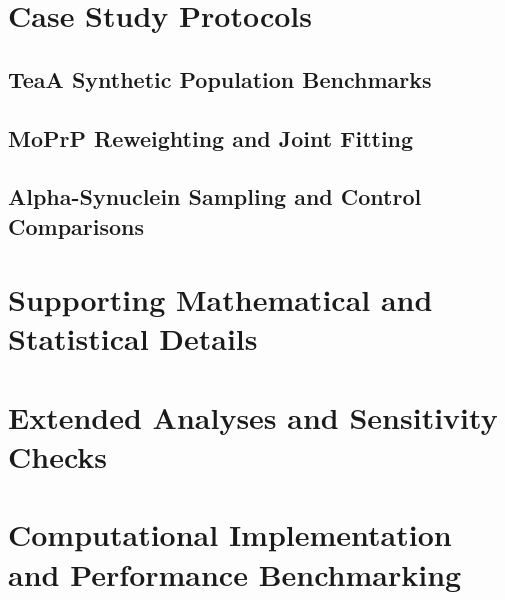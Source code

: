 \section{Case Study Protocols}
\label{app:jaxent-case-studies}

\subsection{TeaA Synthetic Population Benchmarks}
\label{app:jaxent-teaa}

\subsection{MoPrP Reweighting and Joint Fitting}
\label{app:jaxent-moprp}

\subsection{Alpha-Synuclein Sampling and Control Comparisons}
\label{app:jaxent-asyn}

\section{Supporting Mathematical and Statistical Details}
\label{app:jaxent-mathematics}

\section{Extended Analyses and Sensitivity Checks}
\label{app:jaxent-supporting-results}

\section{Computational Implementation and Performance Benchmarking}
\label{app:jaxent-implementation}
